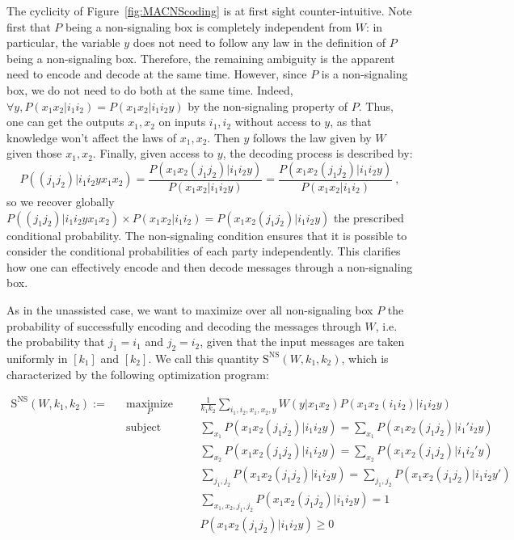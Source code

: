 \documentclass[11pt]{article}
\theoremstyle{definition}
\theoremstyle{remark}
\DeclareMathOperator{\maxi}{\text{maximize}}
\DeclareMathOperator{\st}{\text{subject to}}
\begin{document}
The cyclicity of Figure~\ref{fig:MACNScoding} is at first sight counter-intuitive. Note first that $P$ being a non-signaling box is completely independent from $W$: in particular, the variable $y$ does not need to follow any law in the definition of $P$ being a non-signaling box. Therefore, the remaining ambiguity is the apparent need to encode and decode at the same time. However, since $P$ is a non-signaling box, we do not need to do both at the same time. Indeed, $\forall y, P(x_1x_2|i_1i_2) = P(x_1x_2|i_1i_2y)$ by the non-signaling property of $P$. Thus, one can get the outputs $x_1,x_2$ on inputs $i_1,i_2$ without access to $y$, as that knowledge won't affect the laws of $x_1,x_2$. Then $y$ follows the law given by $W$ given those $x_1,x_2$. Finally, given access to $y$, the decoding process is described by:
          \[ P((j_1 j_2)|i_1 i_2 y x_1 x_2) = \frac{P(x_1 x_2 (j_1 j_2)|i_1 i_2 y)}{P(x_1 x_2 |i_1 i_2 y)} = \frac{P(x_1 x_2 (j_1 j_2)|i_1 i_2 y)}{P(x_1 x_2 |i_1 i_2)} \ , \]
          so we recover globally $P((j_1 j_2)|i_1 i_2 y x_1 x_2) \times P(x_1 x_2 |i_1 i_2) = P(x_1 x_2 (j_1 j_2)|i_1 i_2 y)$ the prescribed conditional probability. 
          The non-signaling condition ensures that it is possible to consider the conditional probabilities of each party independently. This clarifies how one can effectively encode and then decode messages through a non-signaling box.

As in the unassisted case, we want to maximize over all non-signaling box $P$ the probability of successfully encoding and decoding the messages through $W$, i.e. the probability that $j_1 = i_1$ and  $j_2 = i_2$, given that the input messages are taken uniformly in $[k_1]$ and $[k_2]$. We call this quantity $\mathrm{S^{\mathrm{NS}}}(W,k_1,k_2)$, which is characterized by the following optimization program:

\begin{equation}
  \begin{aligned}
    \mathrm{S}^{\mathrm{NS}}(W,k_1,k_2) := &&\underset{P}{\maxi} &&& \frac{1}{k_1k_2} \sum_{i_1,i_2,x_1,x_2,y} W(y|x_1x_2)P(x_1x_2(i_1i_2)|i_1i_2y)\\
    &&\st &&& \sum_{x_1} P(x_1x_2(j_1j_2)|i_1i_2y) = \sum_{x_1} P(x_1x_2(j_1j_2)|i_1'i_2y)\\
    &&&&& \sum_{x_2} P(x_1x_2(j_1j_2)|i_1i_2y) = \sum_{x_2} P(x_1x_2(j_1j_2)|i_1i_2'y)\\
    &&&&& \sum_{j_1,j_2} P(x_1x_2(j_1j_2)|i_1i_2y) = \sum_{j_1,j_2} P(x_1x_2(j_1j_2)|i_1i_2y')\\
    &&&&& \sum_{x_1,x_2,j_1,j_2} P(x_1x_2(j_1j_2)|i_1i_2y) = 1\\
    &&&&& P(x_1x_2(j_1j_2)|i_1i_2y) \geq 0
  \end{aligned}
\end{equation}
\end{document}
